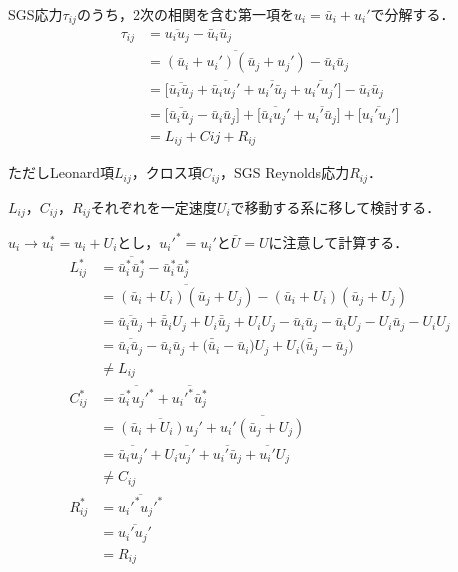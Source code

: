 \documentclass[12pt,a4paper]{jsarticle}
\begin{document}
SGS応力$\tau_{ij}$のうち，2次の相関を含む第一項を$u_i = \bar{u}_i +u_i'$で分解する．
\begin{align}
  \tau_{ij} &= \overline{u_i u_j} -\bar{u}_i \bar{u}_j \nonumber \\
    &= \overline{(\bar{u}_i +u_i') (\bar{u}_j +u_j')} -\bar{u}_i \bar{u}_j \nonumber \\
    &= \Big[ \overline{\bar{u}_i \bar{u}_j} +\overline{\bar{u}_i u_j'} +\overline{u_i' \bar{u}_j} +\overline{u_i' u_j'} \Big] -\bar{u}_i \bar{u}_j \nonumber \\
    &= \Big[ \overline{\bar{u}_i \bar{u}_j} -\bar{u}_i \bar{u}_j \Big] +\Big[ \overline{\bar{u}_i u_j'} +\overline{u_i' \bar{u}_j} \Big] +\Big[ \overline{u_i' u_j'}  \Big] \nonumber \\
    &= L_{ij} +C{ij} +R_{ij} \tag{7.20}
\label{eq:DecompositionofSGSStress}
\end{align}

ただしLeonard項$L_{ij}$，クロス項$C_{ij}$，SGS Reynolds応力$R_{ij}$．\\



$L_{ij}$，$C_{ij}$，$R_{ij}$それぞれを一定速度$U_i$で移動する系に移して検討する．

$u_i \to u_i^* = u_i +U_i$とし，$u_i'^*=u_i'$と$\bar{U}=U$に注意して計算する．
\begin{align}
  L_{ij}^* &= \overline{\bar{u}_i^* \bar{u}_j^*} -\bar{u}_i^* \bar{u}_j^* \nonumber \\
    &= \overline{(\bar{u}_i +U_i) (\bar{u}_j +U_j)} -(\bar{u}_i +U_i) (\bar{u}_j +U_j) \nonumber \\
    &= \overline{\bar{u}_i \bar{u}_j} +\bar{\bar{u}}_i U_j +U_i \bar{\bar{u}}_j +U_i U_j -\bar{u}_i \bar{u}_j -\bar{u}_i U_j -U_i \bar{u}_j -U_i U_j \nonumber \\
    &= \overline{\bar{u}_i \bar{u}_j} -\bar{u}_i \bar{u}_j +\big( \bar{\bar{u}}_i -\bar{u}_i \big) U_j +U_i \big( \bar{\bar{u}}_j -\bar{u}_j \big) \nonumber \\
    &\ne L_{ij}
\label{eq:GalileiTransformofL} \\
  C_{ij}^* &= \overline{\bar{u}_i^* u_j'^*} +\overline{u_i'^* \bar{u}_j^*} \nonumber \\
    &= \overline{(\bar{u}_i +U_i) u_j'} +\overline{u_i' (\bar{u}_j +U_j)} \nonumber \\
    &= \overline{\bar{u}_i u_j'} +U_i \overline{u_j'} +\overline{u_i' \bar{u}_j} +\overline{u_i'} U_j \nonumber \\
    &\ne C_{ij}
\label{eq:GalileiTransformofC} \\
  R_{ij}^* &= \overline{u_i'^* u_j'^*} \nonumber \\
    &= \overline{u_i' u_j'} \nonumber \\
    &= R_{ij}
\label{eq:GalileiTransformofR}
\end{align}
\end{document}
